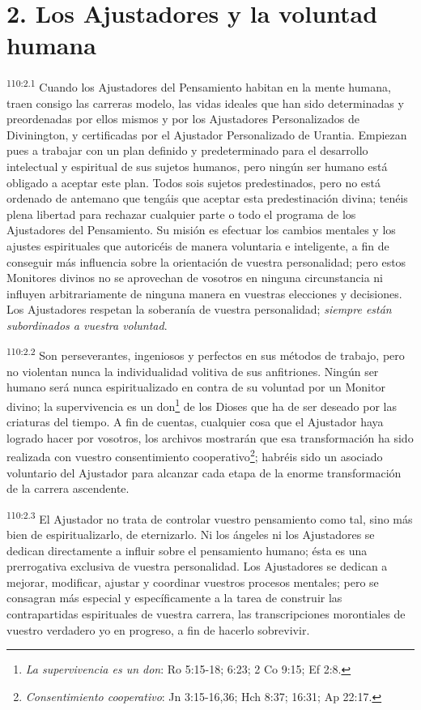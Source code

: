 \documentclass[twoside, 11pt]{book}
\begin{document}
\section*{2. Los Ajustadores y la voluntad humana}
\par
\textsuperscript{110:2.1} Cuando los Ajustadores del Pensamiento habitan en la mente humana, traen consigo las carreras modelo, las vidas ideales que han sido determinadas y preordenadas por ellos mismos y por los Ajustadores Personalizados de Divinington, y certificadas por el Ajustador Personalizado de Urantia. Empiezan pues a trabajar con un plan definido y predeterminado para el desarrollo intelectual y espiritual de sus sujetos humanos, pero ningún ser humano está obligado a aceptar este plan. Todos sois sujetos predestinados, pero no está ordenado de antemano que tengáis que aceptar esta predestinación divina; tenéis plena libertad para rechazar cualquier parte o todo el programa de los Ajustadores del Pensamiento. Su misión es efectuar los cambios mentales y los ajustes espirituales que autoricéis de manera voluntaria e inteligente, a fin de conseguir más influencia sobre la orientación de vuestra personalidad; pero estos Monitores divinos no se aprovechan de vosotros en ninguna circunstancia ni influyen arbitrariamente de ninguna manera en vuestras elecciones y decisiones. Los Ajustadores respetan la soberanía de vuestra personalidad; \textit{siempre están subordinados a vuestra voluntad}.

\par
\textsuperscript{110:2.2} Son perseverantes, ingeniosos y perfectos en sus métodos de trabajo, pero no violentan nunca la individualidad volitiva de sus anfitriones. Ningún ser humano será nunca espiritualizado en contra de su voluntad por un Monitor divino; la supervivencia es un don\footnote{\textit{La supervivencia es un don}: Ro 5:15-18; 6:23; 2 Co 9:15; Ef 2:8.} de los Dioses que ha de ser deseado por las criaturas del tiempo. A fin de cuentas, cualquier cosa que el Ajustador haya logrado hacer por vosotros, los archivos mostrarán que esa transformación ha sido realizada con vuestro consentimiento cooperativo\footnote{\textit{Consentimiento cooperativo}: Jn 3:15-16,36; Hch 8:37; 16:31; Ap 22:17.}; habréis sido un asociado voluntario del Ajustador para alcanzar cada etapa de la enorme transformación de la carrera ascendente.

\par
\textsuperscript{110:2.3} El Ajustador no trata de controlar vuestro pensamiento como tal, sino más bien de espiritualizarlo, de eternizarlo. Ni los ángeles ni los Ajustadores se dedican directamente a influir sobre el pensamiento humano; ésta es una prerrogativa exclusiva de vuestra personalidad. Los Ajustadores se dedican a mejorar, modificar, ajustar y coordinar vuestros procesos mentales; pero se consagran más especial y específicamente a la tarea de construir las contrapartidas espirituales de vuestra carrera, las transcripciones morontiales de vuestro verdadero yo en progreso, a fin de hacerlo sobrevivir.
\end{document}
